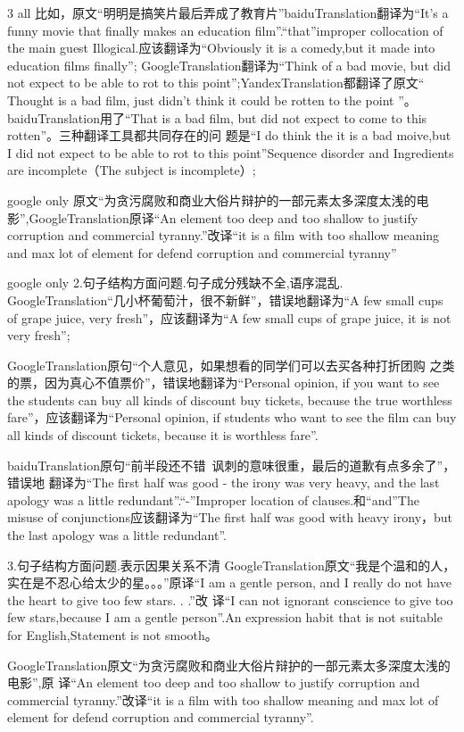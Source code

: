 \documentclass[conference]{IEEEtran}
\begin{document}
\begin{CJK*}{UTF8}{gbsn}
3 all
比如，原文“明明是搞笑片最后弄成了教育片”baiduTranslation翻译为“It's a funny movie that finally makes an education film”.“that”improper collocation of the main guest Illogical.应该翻译为“Obviously it is a comedy,but it  made into education films finally”;
GoogleTranslation翻译为“Think of a bad movie, but did not expect to be able to
rot to this point”;YandexTranslation都翻译了原文“ Thought is a bad film, just
didn't think it could be rotten to the point ”。baiduTranslation用了“That is a
bad film, but did not expect to come to this rotten”。三种翻译工具都共同存在的问
题是“I do think the it is a bad moive,but I did not expect to be able to rot to
this point”Sequence disorder and Ingredients are incomplete（The subject is
incomplete）;

google only
原文“为贪污腐败和商业大俗片辩护的一部元素太多深度太浅的电影”,GoogleTranslation原译“An  element too deep and too shallow to justify corruption and commercial tyranny.”改译“it is a film with too shallow meaning and max lot of element for defend corruption and commercial tyranny”


google only
2.句子结构方面问题.句子成分残缺不全,语序混乱.
GoogleTranslation“几小杯葡萄汁，很不新鲜”，错误地翻译为“A few small cups of
grape juice, very fresh”，应该翻译为“A few small cups of grape juice, it is not
very fresh”;

GoogleTranslation原句“个人意见，如果想看的同学们可以去买各种打折团购
之类的票，因为真心不值票价”，错误地翻译为“Personal opinion, if you want to see
the students can buy all kinds of discount buy tickets, because the true
worthless fare”，应该翻译为“Personal opinion, if students who want to see the
film  can buy all kinds of discount tickets, because it is worthless fare”.

baiduTranslation原句“前半段还不错~讽刺的意味很重，最后的道歉有点多余了”，错误地
翻译为“The first half was good - the irony was very heavy, and the last apology
was a little redundant”.“-”Improper location of clauses.和“and”The misuse of
conjunctions应该翻译为“The first half was good with heavy  irony，but the last
apology was a little redundant”.


3.句子结构方面问题.表示因果关系不清
GoogleTranslation原文“我是个温和的人，实在是不忍心给太少的星。。。”原译“I am a
gentle person, and I really do not have the heart to give too few stars. . .”改
译“I can not ignorant conscience to give too few stars,because I am a gentle
person”.An expression habit that is not suitable for English,Statement is not
smooth。

GoogleTranslation原文“为贪污腐败和商业大俗片辩护的一部元素太多深度太浅的电影”,原
译“An  element too deep and too shallow to justify corruption and commercial
tyranny.”改译“it is a film with too shallow meaning and max lot of element for
defend corruption and commercial tyranny”.


\end{CJK*}
\end{document}
